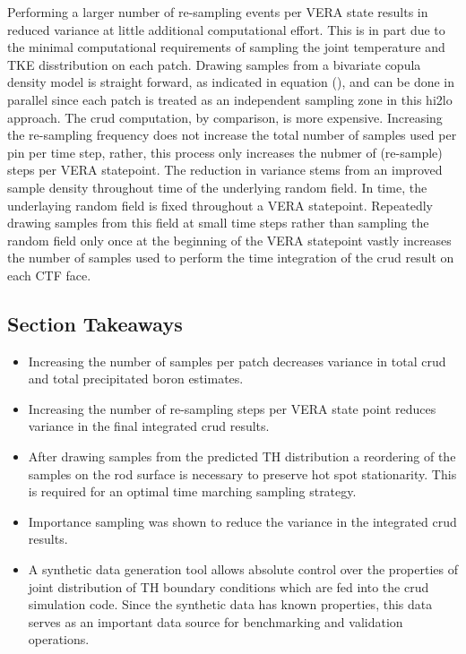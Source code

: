Performing a larger number of re-sampling events per VERA state results in reduced variance at little additional computational effort.
This is in part due to the minimal computational requirements of sampling the joint temperature and TKE disstribution on each patch.  Drawing samples from a bivariate copula density model is straight forward, as indicated in equation (), and can be done in parallel since each patch is treated as an independent sampling zone in this hi2lo approach.  The crud computation, by comparison, is more expensive.  Increasing the re-sampling frequency does not increase the total number of samples used per pin per time step, rather, this process only increases the nubmer of (re-sample) steps per VERA statepoint.  The reduction in variance stems from an improved sample density throughout time of the underlying random field.  In time, the underlaying random field is fixed throughout a VERA statepoint.  Repeatedly drawing samples from this field at small time steps rather than sampling the random field only once at the beginning of the VERA statepoint vastly increases the number of samples used to perform the time integration of the crud result on each CTF face.


\subsection{Section Takeaways}
\begin{itemize}
        \item Increasing the number of samples per patch decreases variance in total crud and total precipitated boron estimates.
        \item Increasing the number of re-sampling steps per VERA state point reduces variance in the final integrated crud results.
        \item After drawing samples from the predicted TH distribution a reordering of the samples on the rod surface is necessary to preserve hot spot stationarity.  This is required for an optimal time marching sampling strategy.
        \item Importance sampling was shown to reduce the variance in the integrated crud results.
        \item A synthetic data generation tool allows absolute control over the properties of joint distribution of TH boundary conditions which are fed into the crud simulation code.  Since the synthetic data has known properties, this data serves as an important data source for benchmarking and validation operations.
\end{itemize}
